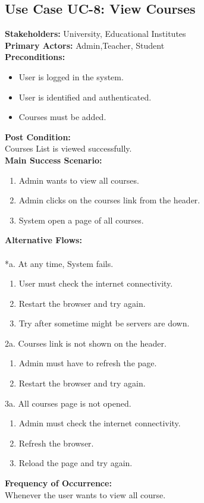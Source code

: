 \subsection{Use Case UC-8: View Courses}
\textbf{Stakeholders: } University, Educational Institutes \\
\textbf{Primary Actors: }Admin,Teacher, Student \\
\textbf{Preconditions:}
\begin{itemize}
\item User is logged in the system.
\item User is identified and authenticated.
\item Courses must be added.
\end{itemize}
\textbf{Post Condition: }\\
Courses List is viewed successfully.\\
\textbf{Main Success Scenario:}
\begin{enumerate}
\item Admin wants to view all courses.
\item Admin clicks on the courses link from the header.
\item System open a page of all courses.
\end{enumerate}
\textbf{Alternative Flows:}\\
\\
*a. At any time, System fails.
\begin{enumerate}
\item User must check the internet connectivity.
\item Restart the browser and try again.
\item Try after sometime might be servers are down.
\end{enumerate}
2a. Courses link is not shown on the header.
\begin{enumerate}
\item Admin must have to refresh the page.
\item Restart the browser and try again.
\end{enumerate} 
3a. All courses page is not opened.
\begin{enumerate}
\item Admin must check the internet connectivity.
\item Refresh the browser.
\item Reload the page and try again.
\end{enumerate}
\textbf{Frequency of Occurrence:}\\
Whenever the user wants to view all course.





